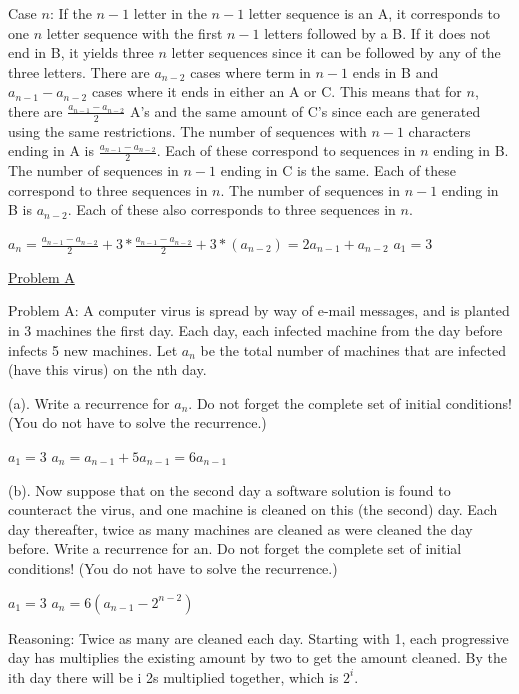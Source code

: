 \documentclass{article}
\begin{document}
Case $n$: If the $n-1$ letter in the $n-1$ letter sequence is an A, it corresponds to one $n$ letter sequence with the first $n-1$ letters followed by a B. If it does not end in B, it yields three $n$ letter sequences since it can be followed by any of the three letters. There are $a_{n-2}$ cases where term in $n-1$ ends in B and $a_{n-1}-a_{n-2}$ cases where it ends in either an A or C. This means that for $n$, there are $\frac{a_{n-1}-a_{n-2}}{2}$ A's and the same amount of C's since each are generated using the same restrictions. The number of sequences with $n-1$ characters ending in A is $\frac{a_{n-1}-a_{n-2}}{2}$. Each of these correspond to sequences in $n$ ending in B. The number of sequences in $n-1$ ending in C is the same. Each of these correspond to three sequences in $n$. The number of sequences in $n-1$ ending in B is $a_{n-2}$. Each of these also corresponds to three sequences in $n$.\newline{}

$a_n= \frac{a_{n-1}-a_{n-2}}{2}+3*\frac{a_{n-1}-a_{n-2}}{2}+3*(a_{n-2})=2a_{n-1}+a_{n-2}$\newline{}
$a_1=3$


\underline{Problem A}\newline{}

Problem A: A computer virus is spread by way of e-mail messages, and is planted in 3 machines the first day. Each day, each infected machine from the day before infects 5 new machines. Let $a_n$ be the total number of machines that are infected (have this virus) on the nth day.\newline{}

(a). Write a recurrence for $a_n$. Do not forget the complete set of initial conditions! (You do not have to solve the recurrence.)\newline{}

$a_1=3$\newline{}
$a_n=a_{n-1}+5a_{n-1}=6a_{n-1}$\newline{}

(b). Now suppose that on the second day a software solution is found to counteract the virus, and one machine is cleaned on this (the second) day. Each day thereafter, twice as many machines are cleaned as were cleaned the day before. Write a recurrence for an. Do not forget the complete set of initial conditions! (You do not have to solve the recurrence.)\newline{}

$a_1=3$\newline{}
$a_n=6(a_{n-1}-2^{n-2})$\newline{}

Reasoning: Twice as many are cleaned each day. Starting with 1, each progressive day has multiplies the existing amount by two to get the amount cleaned. By the ith day there will be i 2s multiplied together, which is $2^i$.\newline{}
\end{document}
